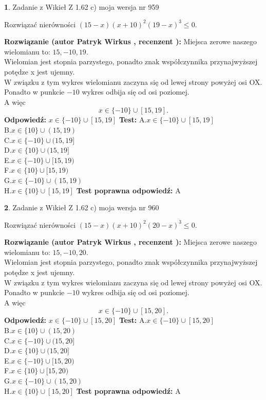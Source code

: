 \documentclass[12pt, a4paper]{article}
\theoremstyle{definition} %
\newtheorem{zad}{}
\newcommand{\zadStart}[1]{\begin{zad}#1\newline}
\newcommand{\zadStop}{\end{zad}}
\newcommand{\rozwStart}[2]{\noindent \textbf{Rozwiązanie (autor #1 , recenzent #2): }\newline}
\newcommand{\rozwStop}{\newline}
\newcommand{\odpStart}{\noindent \textbf{Odpowiedź:}\newline}
\newcommand{\odpStop}{\newline}
\newcommand{\testStart}{\noindent \textbf{Test:}\newline}
\newcommand{\testStop}{\newline}
\newcommand{\kluczStart}{\noindent \textbf{Test poprawna odpowiedź:}\newline}
\newcommand{\kluczStop}{\newline}
\begin{document}
\zadStart{Zadanie z Wikieł Z 1.62 c) moja wersja nr 959}

Rozwiązać nierówności $(15-x)(x+10)^{2}(19-x)^{3}\le0$.
\zadStop
\rozwStart{Patryk Wirkus}{}
Miejsca zerowe naszego wielomianu to: $15, -10, 19$.\\
Wielomian jest stopnia parzystego, ponadto znak współczynnika przy\linebreak najwyższej potędze x jest ujemny.\\ W związku z tym wykres wielomianu zaczyna się od lewej strony powyżej osi OX.\\
Ponadto w punkcie $-10$ wykres odbija się od osi poziomej.\\
A więc $$x \in \{-10\} \cup [15,19].$$
\rozwStop
\odpStart
$x \in \{-10\} \cup [15,19]$
\odpStop
\testStart
A.$x \in \{-10\} \cup [15,19]$\\
B.$x \in \{10\} \cup (15,19)$\\
C.$x \in \{-10\} \cup (15,19]$\\
D.$x \in \{10\} \cup (15,19]$\\
E.$x \in \{-10\} \cup [15,19)$\\
F.$x \in \{10\} \cup [15,19)$\\
G.$x \in \{-10\} \cup (15,19)$\\
H.$x \in \{10\} \cup [15,19]$
\testStop
\kluczStart
A
\kluczStop



\zadStart{Zadanie z Wikieł Z 1.62 c) moja wersja nr 960}

Rozwiązać nierówności $(15-x)(x+10)^{2}(20-x)^{3}\le0$.
\zadStop
\rozwStart{Patryk Wirkus}{}
Miejsca zerowe naszego wielomianu to: $15, -10, 20$.\\
Wielomian jest stopnia parzystego, ponadto znak współczynnika przy\linebreak najwyższej potędze x jest ujemny.\\ W związku z tym wykres wielomianu zaczyna się od lewej strony powyżej osi OX.\\
Ponadto w punkcie $-10$ wykres odbija się od osi poziomej.\\
A więc $$x \in \{-10\} \cup [15,20].$$
\rozwStop
\odpStart
$x \in \{-10\} \cup [15,20]$
\odpStop
\testStart
A.$x \in \{-10\} \cup [15,20]$\\
B.$x \in \{10\} \cup (15,20)$\\
C.$x \in \{-10\} \cup (15,20]$\\
D.$x \in \{10\} \cup (15,20]$\\
E.$x \in \{-10\} \cup [15,20)$\\
F.$x \in \{10\} \cup [15,20)$\\
G.$x \in \{-10\} \cup (15,20)$\\
H.$x \in \{10\} \cup [15,20]$
\testStop
\kluczStart
A
\kluczStop
\end{document}
